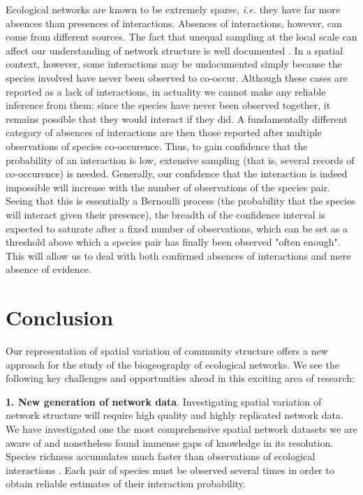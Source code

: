 \documentclass[12pt]{article}
\begin{document}
Ecological networks are known to be extremely sparse, \emph{i.e.} they have
far more absences than presences of interactions. Absences of interactions,
however, can come from different sources. The fact that unequal sampling at
the local scale can affect our understanding of network structure is well
documented \citep{Martinez1999}. In a spatial context, however, some
interactions may be undocumented simply because the species involved have
never been observed to co-occur. Although these cases are reported as a lack
of interactions, in actuality we cannot make any reliable inference from them:
since the species have never been observed together, it remains possible that
they would interact if they did. A fundamentally different category of
absences of interactions are then those reported after multiple observations
of species co-occurence. Thus, to gain confidence that the probability of an
interaction is low, extensive sampling (that is, several records of co-occurence) is needed. Generally, our confidence that the interaction is indeed
impossible will increase with the number of observations of the species pair.
Seeing that this is essentially a Bernoulli process (the probability that the
species will interact given their presence), the breadth of the confidence
interval is expected to saturate after a fixed number of observations, which
can be set as a threshold above which a species pair has finally been observed
"often enough". This will allow us to deal with both confirmed absences of
interactions and mere absence of evidence.

\section*{Conclusion}

Our representation of spatial variation of community structure offers a new
approach for the study of the biogeography of ecological networks. We see the
following key challenges and opportunities ahead in this exciting area of
research:

\textbf{1. New generation of network data}. Investigating spatial
variation of network structure will require high quality and highly replicated
network data. We have investigated one the most comprehensive spatial network
datasets we are aware of and nonetheless found immense gaps of knowledge in its
resolution. Species richness accumulates much faster than observations of
ecological interactions \citep{Poisot2012}. Each pair of species must be
observed several times in order to obtain reliable estimates of their interaction
probability.
\end{document}
